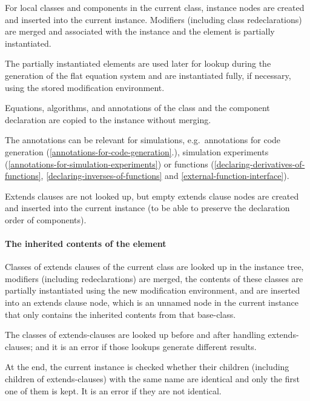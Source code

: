 For local classes and components in the current class, instance nodes
are created and inserted into the current instance. Modifiers (including
class redeclarations) are merged and associated with the instance and
the element is partially instantiated.

\begin{nonnormative}
The partially instantiated elements are used later for lookup during the generation of the flat equation system and are instantiated fully, if necessary, using the
stored modification environment.
\end{nonnormative}

Equations, algorithms, and annotations of the class and the component
declaration are copied to the instance without merging.

\begin{nonnormative}
The annotations can be relevant for simulations, e.g.\ annotations for code generation (\cref{annotations-for-code-generation}.), simulation experiments
(\cref{annotations-for-simulation-experiments}) or functions (\cref{declaring-derivatives-of-functions}, \cref{declaring-inverses-of-functions} and \cref{external-function-interface}).
\end{nonnormative}

Extends clauses are not looked up, but empty extends clause nodes are created and inserted into the current instance (to be able to preserve the declaration order of components).

\paragraph*{The inherited contents of the element}\label{the-inherited-contents-of-the-element}

Classes of extends clauses of the current class are looked up in the
instance tree, modifiers (including redeclarations) are merged, the
contents of these classes are partially instantiated using the new
modification environment, and are inserted into an extends clause node,
which is an unnamed node in the current instance that only contains the
inherited contents from that base-class.

The classes of extends-clauses are looked up before and after handling
extends-clauses; and it is an error if those lookups generate different
results.

At the end, the current instance is checked whether their children
(including children of extends-clauses) with the same name are identical
and only the first one of them is kept.  It is an error if they are not identical.

